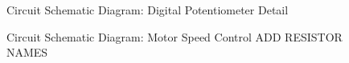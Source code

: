 \documentclass[twoside,a4]{report}
\begin{document}
	\begin{figure}[!htb]
		\centering
		\caption{Circuit Schematic Diagram: Digital Potentiometer Detail}
		\label{circdigpotclose}
	\end{figure} \newline  \noindent
	\begin{figure}[!htb]
		\centering
		\caption{Circuit Schematic Diagram: Motor Speed Control ADD RESISTOR NAMES}
		\label{circspeedcontr}
	\end{figure} \newline  \noindent
\end{document}
